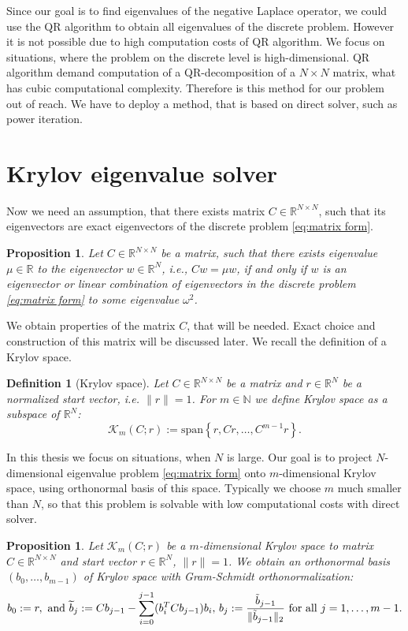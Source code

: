 \documentclass[a4paper,11pt,bibliography=totoc,listof=totoc,headinclude=true,cleardoublepage=empty,oneside]{scrbook}
\newtheorem{definition}[theorem]{Definition}
\newtheorem{prop}[theorem]{Proposition}
\newcommand{\R}{\mathbb{R}}
\newcommand{\N}{\mathbb{N}}
\begin{document}
Since our goal is to find eigenvalues of the negative Laplace operator, we could use the QR algorithm to obtain all eigenvalues of the discrete problem. However it is not possible due to high computation costs of QR algorithm. We focus on situations, where the problem on the discrete level is high-dimensional. QR algorithm demand computation of a QR-decomposition of a $N \times N$ matrix, what has cubic computational complexity. Therefore is this method for our problem out of reach. We have to deploy a method, that is based on direct solver, such as power iteration. 

\section{Krylov eigenvalue solver}
Now we need an assumption, that there exists matrix $C\in \R^{N \times N}$, such that its eigenvectors are exact eigenvectors of the discrete problem \eqref{eq:matrix form}. 
\begin{prop}\label{prop:C}
    Let $C \in \R^{N\times N}$ be a matrix, such that there exists eigenvalue $\mu \in \R$ to the eigenvector $w\in \R^N$, i.e., $Cw = \mu w$, if and only if $w$ is an eigenvector or linear combination of eigenvectors in the discrete problem \eqref{eq:matrix form} to some eigenvalue $\omega^2$.
\end{prop}
We obtain properties of the matrix $C$, that will be needed. Exact choice and construction of this matrix will be discussed later. We recall the definition of a Krylov space. 
\begin{definition}[Krylov space]
    Let $C \in \R^{N \times N}$ be a matrix and $r\in \R^N$ be a normalized start vector, i.e. $\|r\|=1$. For $m\in \N$ we define Krylov space as a subspace of $\R^N$:
    \begin{equation*}
        \mathcal{K}_m(C; r) := \mathrm{span}\left\{r, Cr, \dots, C^{m-1}r\right\}.
    \end{equation*}
\end{definition}
In this thesis we focus on situations, when $N$ is large. Our goal is to project $N$-dimensional eigenvalue problem \eqref{eq:matrix form} onto $m$-dimensional Krylov space, using orthonormal basis of this space. Typically we choose $m$ much smaller than $N$, so that this problem is solvable with low computational costs with direct solver. 
\begin{prop}
    Let $\mathcal{K}_m(C; r)$ be a $m$-dimensional Krylov space to matrix $C\in \R^{N\times N}$ and start vector $r\in \R^N$, $\|r\|=1$. We obtain an orthonormal basis $(b_0, \dots, b_{m-1})$ of Krylov space with Gram-Schmidt orthonormalization:
    \begin{equation*}
        b_0 := r, \text{ and } \widetilde{b}_{j} := Cb_{j-1} - \sum_{i=0}^{j-1} (b_i^T C b_{j-1}) b_i , \, b_j := \frac{\Tilde{b}_{j-1}}{\|\Tilde{b}_{j-1}\|_2} \text{ for all } j=1, \dots, m-1. 
    \end{equation*}
\end{prop}
\end{document}
